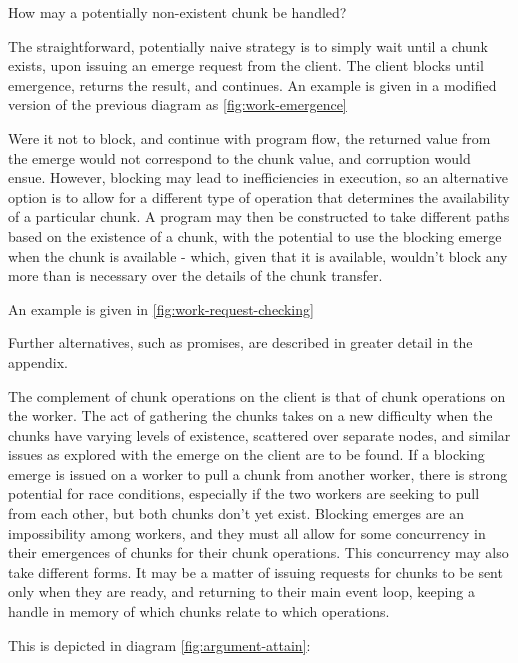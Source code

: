 How may a potentially non-existent chunk be handled?

The straightforward, potentially naive strategy is to simply wait until
a chunk exists, upon issuing an emerge request from the client. The
client blocks until emergence, returns the result, and continues. An
example is given in a modified version of the previous diagram as \cref{fig:work-emergence}


Were it not to block, and continue with program flow, the returned value
from the emerge would not correspond to the chunk value, and corruption
would ensue. However, blocking may lead to inefficiencies in execution,
so an alternative option is to allow for a different type of operation
that determines the availability of a particular chunk. A program may
then be constructed to take different paths based on the existence of a
chunk, with the potential to use the blocking emerge when the chunk is
available - which, given that it is available, wouldn't block any more
than is necessary over the details of the chunk transfer.

An example is given in \cref{fig:work-request-checking}


Further alternatives, such as promises, are described in greater detail
in the appendix.

The complement of chunk operations on the client is that of chunk
operations on the worker. The act of gathering the chunks takes on a new
difficulty when the chunks have varying levels of existence, scattered
over separate nodes, and similar issues as explored with the emerge on
the client are to be found. If a blocking emerge is issued on a worker
to pull a chunk from another worker, there is strong potential for race
conditions, especially if the two workers are seeking to pull from each
other, but both chunks don't yet exist. Blocking emerges are an
impossibility among workers, and they must all allow for some
concurrency in their emergences of chunks for their chunk operations.
This concurrency may also take different forms. It may be a matter of
issuing requests for chunks to be sent only when they are ready, and
returning to their main event loop, keeping a handle in memory of which
chunks relate to which operations.

This is depicted in diagram \cref{fig:argument-attain}:

